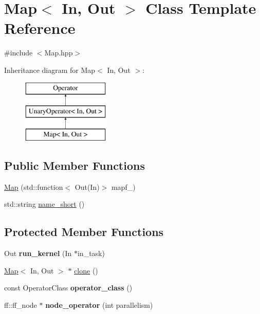 \hypertarget{class_map}{\section{\-Map$<$ \-In, \-Out $>$ \-Class \-Template \-Reference}
\label{class_map}
}


{\ttfamily \#include $<$\-Map.\-hpp$>$}

\-Inheritance diagram for \-Map$<$ \-In, \-Out $>$\-:\begin{figure}[H]
\begin{center}
\leavevmode
\includegraphics[height=3.000000cm]{class_map}
\end{center}
\end{figure}
\subsection*{\-Public \-Member \-Functions}
\begin{DoxyCompactItemize}
\item 
\hyperlink{class_map_a592d69e973dc2596ab688914fb7f5f65}{\-Map} (std\-::function$<$ \-Out(\-In)$>$ mapf\-\_\-)
\item 
std\-::string \hyperlink{class_map_a0ac45a1807983af02472c0a01994bf61}{name\-\_\-short} ()
\end{DoxyCompactItemize}
\subsection*{\-Protected \-Member \-Functions}
\begin{DoxyCompactItemize}
\item 
\hypertarget{class_map_ae61a30423820caac53954f22c5935580}{\-Out {\bfseries run\-\_\-kernel} (\-In $\ast$in\-\_\-task)}\label{class_map_ae61a30423820caac53954f22c5935580}

\item 
\hyperlink{class_map}{\-Map}$<$ \-In, \-Out $>$ $\ast$ \hyperlink{class_map_a0524200b07c1713bc9f3dd60b372b30c}{clone} ()
\item 
\hypertarget{class_map_a5c9fcf56ffe1fd40d3642bcfc561844a}{const \-Operator\-Class {\bfseries operator\-\_\-class} ()}\label{class_map_a5c9fcf56ffe1fd40d3642bcfc561844a}

\item 
\hypertarget{class_map_a28174bb857dab8dda6445a51f91587f3}{ff\-::ff\-\_\-node $\ast$ {\bfseries node\-\_\-operator} (int parallelism)}\label{class_map_a28174bb857dab8dda6445a51f91587f3}

\end{DoxyCompactItemize}
